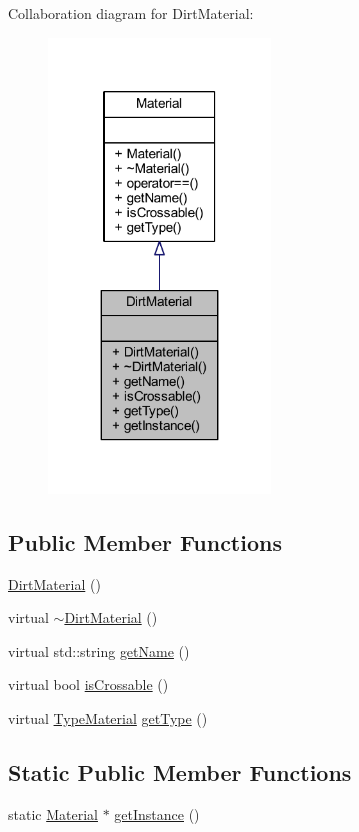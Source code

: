 Collaboration diagram for Dirt\+Material\+:\nopagebreak
\begin{figure}[H]
\begin{center}
\leavevmode
\includegraphics[width=167pt]{class_dirt_material__coll__graph}
\end{center}
\end{figure}
\subsection*{Public Member Functions}
\begin{DoxyCompactItemize}
\item 
\hyperlink{class_dirt_material_a599d74cbb42f09c3eaee6a477e134449}{Dirt\+Material} ()
\item 
virtual \hyperlink{class_dirt_material_a78476bf0571f63d52fabb504142fc3fb}{$\sim$\+Dirt\+Material} ()
\item 
virtual std\+::string \hyperlink{class_dirt_material_a2277ec5c580355d1c236c76d3702cd6b}{get\+Name} ()
\item 
virtual bool \hyperlink{class_dirt_material_a41d6aaeb52cbf83b14a21be40f87570e}{is\+Crossable} ()
\item 
virtual \hyperlink{_material_8hpp_af43d43a4fff6221e289f8d3db9904ec0}{Type\+Material} \hyperlink{class_dirt_material_ac27c51428f3c21dd43248e5f32ecb147}{get\+Type} ()
\end{DoxyCompactItemize}
\subsection*{Static Public Member Functions}
\begin{DoxyCompactItemize}
\item 
static \hyperlink{class_material}{Material} $\ast$ \hyperlink{class_dirt_material_a5b76dee9ff017825fcc522b272593944}{get\+Instance} ()
\end{DoxyCompactItemize}


